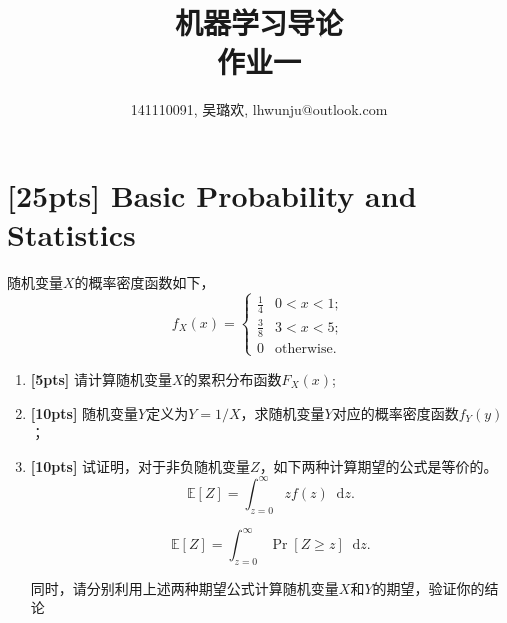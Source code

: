 \documentclass[a4paper,UTF8]{article}
\numberwithin{equation}{section}
\newcommand*\diff{\mathop{}\!\mathrm{d}}
\begin{document}
\title{机器学习导论\\
作业一}
\author{141110091, 吴璐欢, lhwunju@outlook.com}
\maketitle

\section{[25pts] Basic Probability and Statistics}
随机变量$X$的概率密度函数如下，
\begin{equation}
	f_X(x) = 
	\begin{cases}
		\frac{1}{4} & 0<x<1;\\
		\frac{3}{8} & 3<x<5;\\
		0			& \mbox{otherwise.}
	\end{cases}
\end{equation}
\begin{enumerate}[ {(}1{)}]
\item \textbf{[5pts]} 请计算随机变量$X$的累积分布函数$F_X(x)$;
\item \textbf{[10pts]} 随机变量$Y$定义为$Y = 1/X$，求随机变量$Y$对应的概率密度函数$f_Y(y)$；
\item \textbf{[10pts]} 试证明，对于非负随机变量$Z$，如下两种计算期望的公式是等价的。
\begin{equation}
	\label{eq-expect-1}
	\mathbb{E}[Z] = \int_{z=0}^{\infty}zf(z) \diff z.
\end{equation}

\begin{equation}
	\label{eq-expect-2}
	\mathbb{E}[Z] = \int_{z=0}^{\infty}\Pr[Z\geq z] \diff z.
\end{equation}

同时，请分别利用上述两种期望公式计算随机变量$X$和$Y$的期望，验证你的结论
\end{enumerate}
\end{document}
